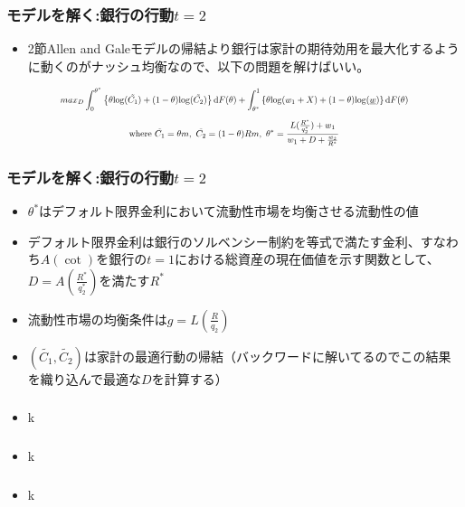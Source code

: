 \documentclass[dvipdfmx, 12pt]{beamer}
\begin{document}
\begin{frame}\frametitle{モデルを解く:銀行の行動$t = 2$}
	\begin{itemize}
		\item 2節Allen and Galeモデルの帰結より銀行は家計の期待効用を最大化するように動くのがナッシュ均衡なので、以下の問題を解けばいい。
	\end{itemize}
	\begin{align*}
	\scalebox{0.7}{$\displaystyle
	max_{D} \int_0^{\theta^*}\left\{ \theta{\rm log}(\tilde{C_1})+(1-\theta){\rm log}(\tilde{C_2}) \right\}\mathrm{d}F(\theta) + \int_{\theta^*}^1 \left\{ \theta{\rm log}(w_1+X)+(1-\theta){\rm log}(\underline{w}) \right\}\mathrm{d}F(\theta)
	$}
	\end{align*}
	\begin{align*}
	\scalebox{0.7}{$\displaystyle
		\text{where}\ \tilde{C_1} = \theta m,\ \tilde{C_2} = (1-\theta)Rm,\ \theta^* = \frac{L(\frac{R^*}{q_2^*}) + w_1}{w_1 + D + \frac{w_2}{R^*}}
		$}
	\end{align*}
\end{frame}

\begin{frame}\frametitle{モデルを解く:銀行の行動$t = 2$}
	\begin{itemize}
		\item $\theta^*$はデフォルト限界金利において流動性市場を均衡させる流動性の値
		\item デフォルト限界金利は銀行のソルベンシー制約を等式で満たす金利、すなわち$A(\cot)$を銀行の$t=1$における総資産の現在価値を示す関数として、$D = A\left( \frac{R^*}{q_2^*} \right)$を満たす$R^*$
		\item 流動性市場の均衡条件は$g = L\left(\frac{R}{q_2}\right)$
		\item $(\tilde{C_1}, \tilde{C_2})$は家計の最適行動の帰結（バックワードに解いてるのでこの結果を織り込んで最適な$D$を計算する）
	\end{itemize}
\end{frame}

\begin{frame}\frametitle{}
	\begin{itemize}
		\item k
	\end{itemize}
\end{frame}

\begin{frame}\frametitle{}
	\begin{itemize}
		\item k
	\end{itemize}
\end{frame}

\begin{frame}\frametitle{}
	\begin{itemize}
		\item k
	\end{itemize}
\end{frame}
\end{document}
